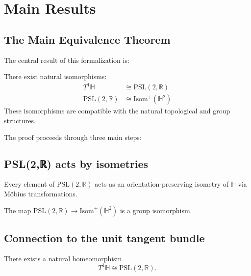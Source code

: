 \chapter{Main Results}

\section{The Main Equivalence Theorem}

The central result of this formalization is:

\begin{theorem}
\label{thm:main_equivalence}
There exist natural isomorphisms:
\begin{align*}
T^1\mathbb{H} &\cong \mathrm{PSL}(2,\mathbb{R}) \\
\mathrm{PSL}(2,\mathbb{R}) &\cong \mathrm{Isom}^+(\mathbb{H}^2)
\end{align*}
These isomorphisms are compatible with the natural topological and group structures.
\end{theorem}

The proof proceeds through three main steps:

\section{PSL(2,ℝ) acts by isometries}

\begin{theorem}
\label{thm:psl2r_to_isom}
Every element of $\mathrm{PSL}(2,\mathbb{R})$ acts as an orientation-preserving isometry of $\mathbb{H}$ via Möbius transformations.
\end{theorem}

\begin{theorem}
\label{thm:psl2r_isom_bijection}
The map $\mathrm{PSL}(2,\mathbb{R}) \to \mathrm{Isom}^+(\mathbb{H}^2)$ is a group isomorphism.
\end{theorem}

\section{Connection to the unit tangent bundle}

\begin{theorem}
\label{thm:t1h_to_psl2r}
There exists a natural homeomorphism
\[ T^1\mathbb{H} \cong \mathrm{PSL}(2,\mathbb{R}). \]
\end{theorem}

